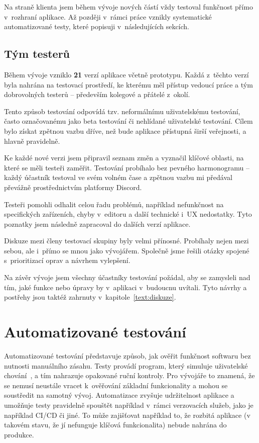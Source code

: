 Na straně klienta jsem během vývoje nových částí vždy testoval funkčnost přímo v~rozhraní aplikace.
Až později v~rámci práce vznikly systematické automatizované testy, které popisuji v~následujících sekcích.

\subsection{Tým testerů}

Během vývoje vzniklo \textbf{21} verzí aplikace včetně prototypu. 
Každá z~těchto verzí byla nahrána na testovací prostředí, ke kterému měl přístup vedoucí práce a tým dobrovolných testerů -- především kolegové a přátelé z~okolí.

Tento způsob testování odpovídá tzv. neformálnímu uživatelskému testování, často označovanému jako beta testování či nehlídané uživatelské testování. 
Cílem bylo získat zpětnou vazbu dříve, než bude aplikace přístupná širší veřejnosti, a hlavně pravidelně.

Ke každé nové verzi jsem připravil seznam změn a vyznačil klíčové oblasti, na které se měli testeři zaměřit. 
Testování probíhalo bez pevného harmonogramu -- každý účastník testoval ve svém volném čase a zpětnou vazbu mi předával převážně prostřednictvím platformy Discord.

Testeři pomohli odhalit celou řadu problémů, například nefunkčnost na specifických zařízeních, chyby v~editoru a další technické i~UX nedostatky. 
Tyto poznatky jsem následně zapracoval do dalších verzí aplikace.

Diskuze mezi členy testovací skupiny byly velmi přínosné.
Probíhaly nejen mezi sebou, ale i~přímo se mnou jako vývojářem. 
Společně jsme řešili otázky spojené s~prioritizací oprav a návrhem vylepšení.

Na závěr vývoje jsem všechny účastníky testování požádal, aby se zamysleli nad tím, jaké funkce nebo úpravy by v~aplikaci v~budoucnu uvítali. 
Tyto návrhy a postřehy jsou taktéž zahrnuty v~kapitole~\ref{text:diskuze}.

\section{Automatizované testování}

Automatizované testování představuje způsob, jak ověřit funkčnost softwaru bez nutnosti manuálního zásahu.
Testy provádí program, který simuluje uživatelské chování~\cite{meszaros_2007}, a tím nahrazuje opakované ruční kontroly.
Pro vývojáře to znamená, že se nemusí neustále vracet k~ověřování základní funkcionality a mohou se soustředit na samotný vývoj. 
Automatizace zvyšuje udržitelnost aplikace a umožňuje testy pravidelně spouštět například v~rámci verzovacích služeb, jako je například CI/CD či jiné.
To může zajišťovat například to, že rozbitá aplikace (v takovém stavu, že jí nefunguje klíčová funkcionalita) nebude nahrána do produkce.

